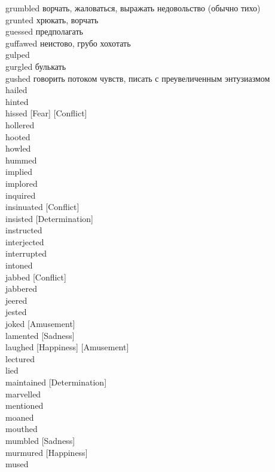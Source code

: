 \documentclass[a4paper,12pt,fleqn]{book}\usepackage{cooltooltips}\usepackage{polyglossia}\setdefaultlanguage[babelshorthands=true]{russian}\setotherlanguage{english}\defaultfontfeatures{Ligatures=TeX,Mapping=tex-text} \usepackage{xcolor}\definecolor{lightgray}{HTML}{bbbbbb}\color{lightgray}\newcommand{\ml}[3]{\textenglish{\textcolor{black}{#3}}}
\begin{document}
{grumbled \hfill ворчать, жаловаться, выражать недовольство (обычно тихо)\\
grunted \hfill хрюкать, ворчать\\
guessed \hfill предполагать\\
guffawed \hfill неистово, грубо хохотать\\
gulped \hfill \\
gurgled \hfill булькать\\
gushed \hfill говорить потоком чувств, писать с преувеличенным энтузиазмом\\
hailed \hfill \\
hinted \hfill \\
hissed [Fear] [Conflict] \hfill \\
hollered \hfill \\
hooted \hfill \\
howled \hfill \\
hummed \hfill \\
implied \hfill \\
implored \hfill \\
inquired \hfill \\
insinuated [Conflict] \hfill \\
insisted [Determination] \hfill \\
instructed \hfill \\
interjected \hfill \\
interrupted \hfill \\
intoned \hfill \\
jabbed [Conflict] \hfill \\
jabbered \hfill \\
jeered \hfill \\
jested \hfill \\
joked [Amusement] \hfill \\
lamented [Sadness] \hfill \\
laughed [Happiness] [Amusement] \hfill \\
lectured \hfill \\
lied \hfill \\
maintained [Determination] \hfill \\
marvelled \hfill \\
mentioned \hfill \\
moaned \hfill \\
mouthed \hfill \\
mumbled [Sadness] \hfill \\
murmured [Happiness] \hfill \\
mused \hfill \\
}
\end{document}
